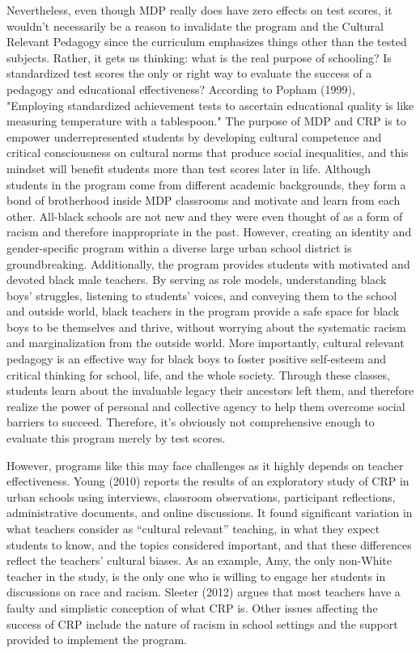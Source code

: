 Nevertheless, even though MDP really does have zero effects on test scores, it wouldn't necessarily be a reason to invalidate the program and the Cultural Relevant Pedagogy since the curriculum emphasizes things other than the tested subjects. Rather, it gets us thinking: what is the real purpose of schooling? Is standardized test scores the only or right way to evaluate the success of a pedagogy and educational effectiveness? According to Popham (1999), "Employing standardized achievement tests to ascertain educational quality is like measuring temperature with a tablespoon." The purpose of MDP and CRP is to empower underrepresented students by developing cultural competence and critical consciousness on cultural norms that produce social inequalities, and this mindset will benefit students more than test scores later in life. Although students in the program come from different academic backgrounds, they form a bond of brotherhood inside MDP classrooms and motivate and learn from each other. All-black schools are not new and they were even thought of as a form of racism and therefore inappropriate in the past. However, creating an identity and gender-specific program within a diverse large urban school district is groundbreaking. Additionally, the program provides students with motivated and devoted black male teachers. By serving as role models, understanding black boys’ struggles, listening to students’ voices, and conveying them to the school and outside world, black teachers in the program provide a safe space for black boys to be themselves and thrive, without worrying about the systematic racism and marginalization from the outside world. More importantly, cultural relevant pedagogy is an effective way for black boys to foster positive self-esteem and critical thinking for school, life, and the whole society. Through these classes, students learn about the invaluable legacy their ancestors left them, and therefore realize the power of personal and collective agency to help them overcome social barriers to succeed. Therefore, it's obviously not comprehensive enough to evaluate this program merely by test scores.

However, programs like this may face challenges as it highly depends on teacher effectiveness. Young (2010) reports the results of an exploratory study of CRP in urban schools using interviews, classroom observations, participant reflections, administrative documents, and online discussions. It found significant variation in what teachers consider as “cultural relevant” teaching, in what they expect students to know, and the topics considered important, and that these differences reflect the teachers’ cultural biases. As an example, Amy, the only non-White teacher in the study, is the only one who is willing to engage her students in discussions on race and racism. Sleeter (2012) argues that most teachers have a faulty and simplistic conception of what CRP is. Other issues affecting the success of CRP include the nature of racism in school settings and the support provided to implement the program.

